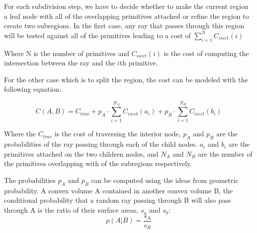 For each subdivision step, we have to decide whether to make the current region a leaf node with all of the overlapping primitives attached or refine the region to create two subregions. In the first case, any ray that passes through this region will be tested against all of the primitives leading to a cost of 
        $\displaystyle\sum\limits_{i=1}^N C_{isect}(i)$

Where N is the number of primitives and \(C_{isect}(i)\) is the cost of computing the intersection between the ray and the \(i\)th primitive. 

For the other case which is to split the region, the cost can be modeled with the following equation:

\begin{equation} 
        \label{eq:CostOneStep}
        C(A, B) = C_{trav} + p_{A} \cdot \sum\limits_{i=1}^{N_{A}} C_{isect}(a_{i}) + p_{B} \cdot \sum\limits_{i=1}^{N_{B}} C_{isect}(b_{i})
\end{equation}

Where the \(C_{trav}\) is the cost of traversing the interior node, \(p_{A}\) and \(p_{B}\) are the probabilities of the ray passing through each of the child nodes. \(a_{i}\) and \(b_{i}\) are the primitives attached on the two children nodes, and \(N_{A}\) and \(N_{B}\) are the number of the primitives overlapping with of the subregions respectively. 

The probabilities \(p_{A}\) and \(p_{B}\) can be computed using the ideas from geometric probability. A convex volume A contained in another convex volume B, the conditional probability that a random ray passing through B will also pass through A is the ratio of their surface areas, \(s_{a}\) and \(s_{b}\): 
\begin{equation} 
        p(A|B) = \frac{s_{A}}{s_{B}} 
\end{equation}

